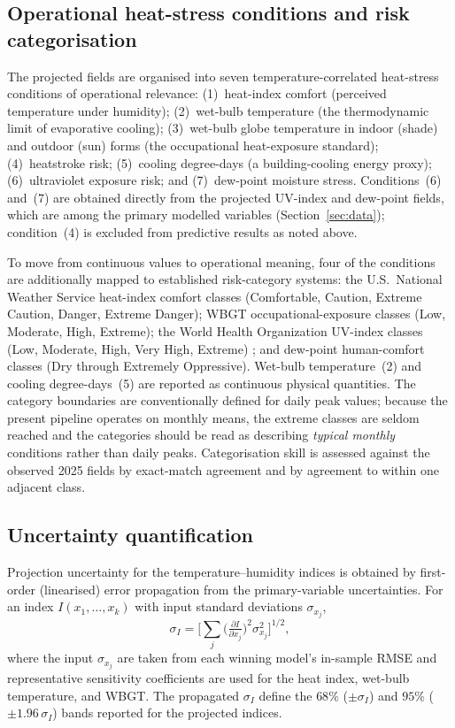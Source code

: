 \documentclass[review,11pt]{elsarticle}
\begin{document}
\subsection{Operational heat-stress conditions and risk categorisation}
\label{sec:conditions}
The projected fields are organised into seven temperature-correlated heat-stress
conditions of operational relevance: (1)~heat-index comfort (perceived
temperature under humidity); (2)~wet-bulb temperature (the thermodynamic limit of
evaporative cooling); (3)~wet-bulb globe temperature in indoor (shade) and outdoor
(sun) forms (the occupational heat-exposure standard); (4)~heatstroke risk;
(5)~cooling degree-days (a building-cooling energy proxy); (6)~ultraviolet
exposure risk; and (7)~dew-point moisture stress. Conditions~(6) and~(7) are
obtained directly from the projected UV-index and dew-point fields, which are
among the primary modelled variables (Section~\ref{sec:data}); condition~(4) is
excluded from predictive results as noted above.

To move from continuous values to operational meaning, four of the conditions are
additionally mapped to established risk-category systems: the U.S.\ National
Weather Service heat-index comfort classes (Comfortable, Caution, Extreme
Caution, Danger, Extreme Danger); WBGT occupational-exposure classes (Low,
Moderate, High, Extreme); the World Health Organization UV-index classes (Low,
Moderate, High, Very High, Extreme) \citep{who2002}; and dew-point human-comfort
classes (Dry through Extremely Oppressive). Wet-bulb temperature~(2) and cooling
degree-days~(5) are reported as continuous physical quantities. The category
boundaries are conventionally defined for daily peak values; because the present
pipeline operates on monthly means, the extreme classes are seldom reached and
the categories should be read as describing \emph{typical monthly} conditions
rather than daily peaks. Categorisation skill is assessed against the observed
2025 fields by exact-match agreement and by agreement to within one adjacent
class.

\subsection{Uncertainty quantification}\label{sec:uncertainty}
Projection uncertainty for the temperature--humidity indices is obtained by
first-order (linearised) error propagation from the primary-variable
uncertainties. For an index $I(x_1,\dots,x_k)$ with input standard deviations
$\sigma_{x_j}$,
\begin{equation}
\sigma_{I}=\Bigg[\sum_{j}\Big(\tfrac{\partial I}{\partial x_j}\Big)^{2}
\sigma_{x_j}^{2}\Bigg]^{1/2},
\label{eq:errprop}
\end{equation}
where the input $\sigma_{x_j}$ are taken from each winning model's in-sample
RMSE and representative sensitivity coefficients are used for the heat index,
wet-bulb temperature, and WBGT. The propagated $\sigma_{I}$ define the
$68\%$ ($\pm\sigma_{I}$) and $95\%$ ($\pm1.96\,\sigma_{I}$) bands reported for
the projected indices.
\end{document}
